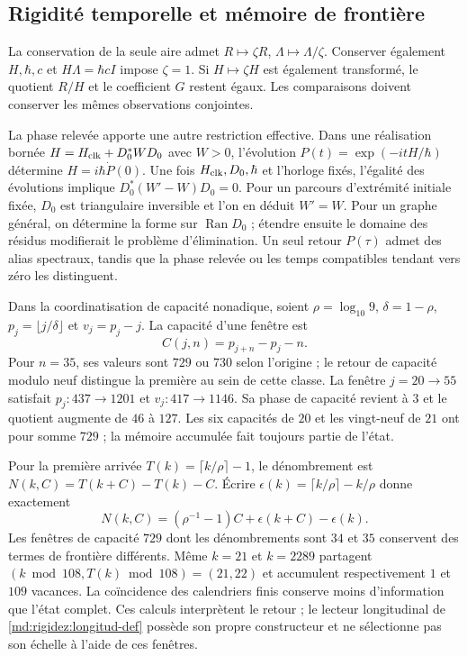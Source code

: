 \subsection{Rigidité temporelle et mémoire de frontière}
\label{md:rigidez:memoria}

La conservation de la seule aire admet $R\mapsto\zeta R$, $\Lambda\mapsto\Lambda/\zeta$. Conserver également $H,\hbar,c$ et $H\Lambda=\hbar cI$ impose $\zeta=1$. Si $H\mapsto\zeta H$ est également transformé, le quotient $R/H$ et le coefficient $G$ restent égaux. Les comparaisons doivent conserver les mêmes observations conjointes.

La phase relevée apporte une autre restriction effective. Dans une réalisation bornée $H=H_{\rm clk}+D_0^*WD_0$ avec $W>0$, l'évolution $P(t)=\exp(-itH/\hbar)$ détermine $H=i\hbar\dot P(0)$. Une fois $H_{\rm clk},D_0,\hbar$ et l'horloge fixés, l'égalité des évolutions implique $D_0^*(W'-W)D_0=0$. Pour un parcours d'extrémité initiale fixée, $D_0$ est triangulaire inversible et l'on en déduit $W'=W$. Pour un graphe général, on détermine la forme sur $\operatorname{Ran}D_0$ ; étendre ensuite le domaine des résidus modifierait le problème d'élimination. Un seul retour $P(\tau)$ admet des alias spectraux, tandis que la phase relevée ou les temps compatibles tendant vers zéro les distinguent.

Dans la coordinatisation de capacité nonadique, soient $\rho=\log_{10}9$, $\delta=1-\rho$, $p_j=\lfloor j/\delta\rfloor$ et $v_j=p_j-j$. La capacité d'une fenêtre est
\[
 C(j,n)=p_{j+n}-p_j-n.
\]
Pour $n=35$, ses valeurs sont $729$ ou $730$ selon l'origine ; le retour de capacité modulo neuf distingue la première au sein de cette classe. La fenêtre $j=20\to55$ satisfait $p_j:437\to1201$ et $v_j:417\to1146$. Sa phase de capacité revient à $3$ et le quotient augmente de $46$ à $127$. Les six capacités de $20$ et les vingt-neuf de $21$ ont pour somme $729$ ; la mémoire accumulée fait toujours partie de l'état.

Pour la première arrivée $T(k)=\lceil k/\rho\rceil-1$, le dénombrement est $N(k,C)=T(k+C)-T(k)-C$. Écrire $\epsilon(k)=\lceil k/\rho\rceil-k/\rho$ donne exactement
\[
 N(k,C)=(\rho^{-1}-1)C+\epsilon(k+C)-\epsilon(k).
\]
Les fenêtres de capacité $729$ dont les dénombrements sont $34$ et $35$ conservent des termes de frontière différents. Même $k=21$ et $k=2289$ partagent $(k\bmod108,T(k)\bmod108)=(21,22)$ et accumulent respectivement $1$ et $109$ vacances. La coïncidence des calendriers finis conserve moins d'information que l'état complet. Ces calculs interprètent le retour ; le lecteur longitudinal de \eqref{md:rigidez:longitud-def} possède son propre constructeur et ne sélectionne pas son échelle à l'aide de ces fenêtres.

